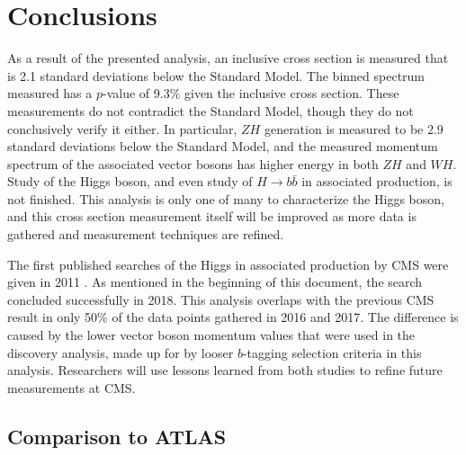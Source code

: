 \chapter{Conclusions} \label{ch:conclusion}

As a result of the presented analysis,
an inclusive cross section is measured that is 2.1 standard deviations below the Standard Model.
The binned spectrum measured has a $p$-value of 9.3\% given the inclusive cross section.
These measurements do not contradict the Standard Model, though they do not conclusively verify it either.
In particular, $Z\!H$ generation is measured to be 2.9 standard deviations below the Standard Model,
and the measured momentum spectrum of the associated vector bosons has higher energy in both $Z\!H$ and $W\!H$.
Study of the Higgs boson, and even study of $H\rightarrow b\bar{b}$ in associated production, is not finished.
This analysis is only one of many to characterize the Higgs boson,
and this cross section measurement itself will be improved as more data is gathered
and measurement techniques are refined.

The first published searches of the Higgs in associated production by CMS
were given in 2011 \cite{CMS-PAS-HIG-11-012}.
As mentioned in the beginning of this document, the search concluded successfully in 2018.
This analysis overlaps with the previous CMS result in only 50\% of the data points gathered in 2016 and 2017.
The difference is caused by the lower vector boson momentum values that were used in the discovery analysis,
made up for by looser $b$-tagging selection criteria in this analysis.
Researchers will use lessons learned from both studies to refine future measurements at CMS.

\section{Comparison to ATLAS}


